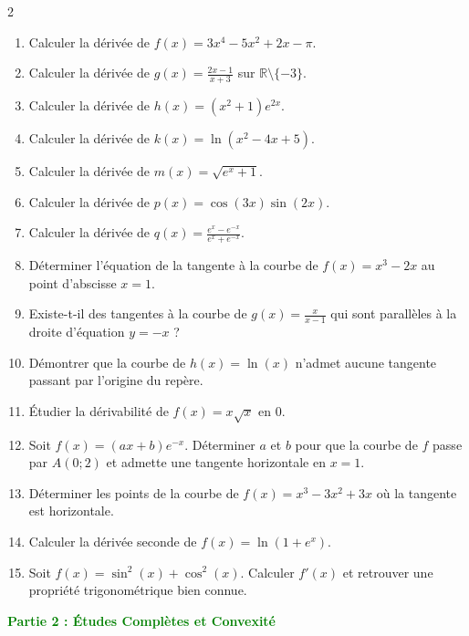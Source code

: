 \documentclass[10pt, a4paper]{article}
\begin{document}
\begin{multicols}{2}
\begin{enumerate}
    \item Calculer la dérivée de $\displaystyle f(x) = 3x^4 - 5x^2 + 2x - \pi$.
    \item Calculer la dérivée de $\displaystyle g(x) = \frac{2x - 1}{x + 3}$ sur $\mathbb{R} \setminus \{-3\}$.
    \item Calculer la dérivée de $\displaystyle h(x) = (x^2 + 1)e^{2x}$.
    \item Calculer la dérivée de $\displaystyle k(x) = \ln(x^2 - 4x + 5)$.
    \item Calculer la dérivée de $\displaystyle m(x) = \sqrt{e^x + 1}$.
    \item Calculer la dérivée de $\displaystyle p(x) = \cos(3x) \sin(2x)$.
    \item Calculer la dérivée de $\displaystyle q(x) = \frac{e^x - e^{-x}}{e^x + e^{-x}}$.
    \item Déterminer l'équation de la tangente à la courbe de $f(x) = x^3 - 2x$ au point d'abscisse $x=1$.
    \item Existe-t-il des tangentes à la courbe de $g(x) = \frac{x}{x-1}$ qui sont parallèles à la droite d'équation $y = -x$ ?
    \item Démontrer que la courbe de $h(x) = \ln(x)$ n'admet aucune tangente passant par l'origine du repère.
    \item Étudier la dérivabilité de $f(x) = x\sqrt{x}$ en $0$.
    \item Soit $f(x) = (ax+b)e^{-x}$. Déterminer $a$ et $b$ pour que la courbe de $f$ passe par $A(0; 2)$ et admette une tangente horizontale en $x=1$.
    \item Déterminer les points de la courbe de $f(x) = x^3 - 3x^2 + 3x$ où la tangente est horizontale.
    \item Calculer la dérivée seconde de $f(x) = \ln(1+e^x)$.
    \item Soit $f(x) = \sin^2(x) + \cos^2(x)$. Calculer $f'(x)$ et retrouver une propriété trigonométrique bien connue.
\end{enumerate}
\end{multicols}

\vspace{0.5cm}
\Large
\textbf{\textcolor{green}{Partie 2 : Études Complètes et Convexité}}
\normalsize
\vspace{0.2cm}
\end{document}
